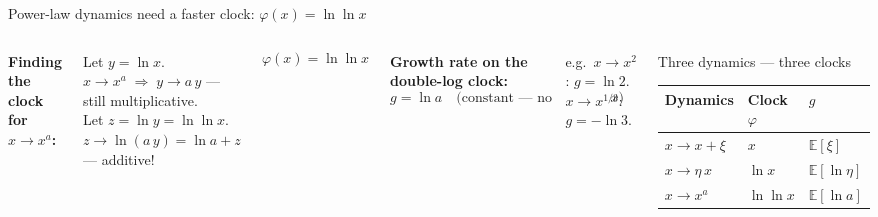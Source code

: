 \begin{frame}{Power-law dynamics need a faster clock: $\varphi(x) = \ln\ln x$}

\begin{columns}[T]
\textbf{Finding the clock for $x \to x^a$:}

\vspace{0.4em}
Let $y = \ln x$.\quad $x \to x^a \;\Rightarrow\; y \to a\,y$ \quad — still multiplicative.\\[0.3em]
Let $z = \ln y = \ln\ln x$. \; $z \to \ln(a\,y) = \ln a + z$ \quad — \textcolor{EEgreen}{additive!}

\vspace{0.5em}
\[
  \boxed{\varphi(x) = \ln\ln x}
\]

\vspace{0.6em}
\textbf{Growth rate on the double-log clock:}
\[
  g = \ln a \quad \text{(constant — no dependence on } x \text{)}
\]

{\small\color{EEgrey} e.g.\ $x \to x^2$: $g = \ln 2$. \quad $x \to x^{1/3}$: $g = -\ln 3$.}

\vspace{0.5em}
\begin{block}{Three dynamics — three clocks}
\vspace{0.3em}
\small
\begin{tabular}{lll}
\toprule
Dynamics & Clock $\varphi$ & $g$ \\
\midrule
$x \to x + \xi$ & $x$ & $\mathbb{E}[\xi]$ \\[4pt]
$x \to \eta\,x$ & $\ln x$ & $\mathbb{E}[\ln\eta]$ \\[4pt]
$x \to x^a$ & $\ln\ln x$ & $\mathbb{E}[\ln a]$ \\
\bottomrule
\end{tabular}
\vspace{0.2em}
\end{block}

\vspace{0.8em}
\end{columns}
\end{frame}

